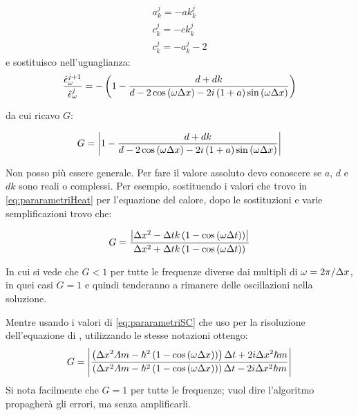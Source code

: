 \begin{equation*}
  \begin{array}{l}
    a_k^j = - ak_k^j \\
    c_k^j = - ck_k^j \\
    c_k^j = -a_k^j -2
  \end{array}
\end{equation*}
e sostituisco nell'uguaglianza:
\begin{equation}
  \frac{\hat{\epsilon}^{j+1}_\o}{\hat{\epsilon}^j_\o}= -\lrt{1 -
    \frac{d+dk}{d-2 \cos\lrt{\o \Delta x}-2 i\lrt{1+a}\sin\lrt{\o \Delta x}}}
\end{equation}

da cui ricavo $G$:

\begin{equation}
  G = \lr||{1 -
    \frac{d+dk}{d-2 \cos\lrt{\o \Delta x}-2 i\lrt{1+a}\sin\lrt{\o \Delta x}}}
\end{equation}

Non posso pi\`u essere generale. Per fare il valore assoluto devo conoscere se $a$, $d$ e $dk$ sono reali o complessi.
Per esempio, sostituendo i valori che trovo in \eqref{eq:pararametriHeat} per l'equazione del calore, dopo le sostituzioni e varie semplificazioni trovo che:

\begin{equation}
  G = \frac{\lr||{\Delta x^2 - \Delta t k \lrt{1-\cos\lrt{\o \Delta t}}}}{\Delta x^2 + \Delta t k \lrt{1-\cos\lrt{\o \Delta t}}}
\end{equation}

In cui si vede che $G<1$ per tutte le frequenze diverse dai multipli di $\o = 2\pi/\Delta x$, in quei casi $G=1$ e quindi tenderanno a rimanere delle oscillazioni nella soluzione.

Mentre usando i valori di \eqref{eq:pararametriSC} che uso per la risoluzione dell'equazione di \Schrodinger, utilizzando le stesse notazioni ottengo:
\begin{equation}
  G = \lr||{\frac{\lrt{\Delta x^2 \varLambda m - \hbar^2\lrt{1-\cos\lrt{\o \Delta x}}}\Delta t+2 i \Delta x^2 \hbar m}
    {\lrt{\Delta x^2 \varLambda m - \hbar^2\lrt{1-\cos\lrt{\o \Delta x}}}\Delta t-2 i \Delta x^2 \hbar m}}
\end{equation}
Si nota facilmente che $G=1$ per tutte le frequenze; vuol dire l'algoritmo propagher\`a gli errori, ma senza amplificarli.
